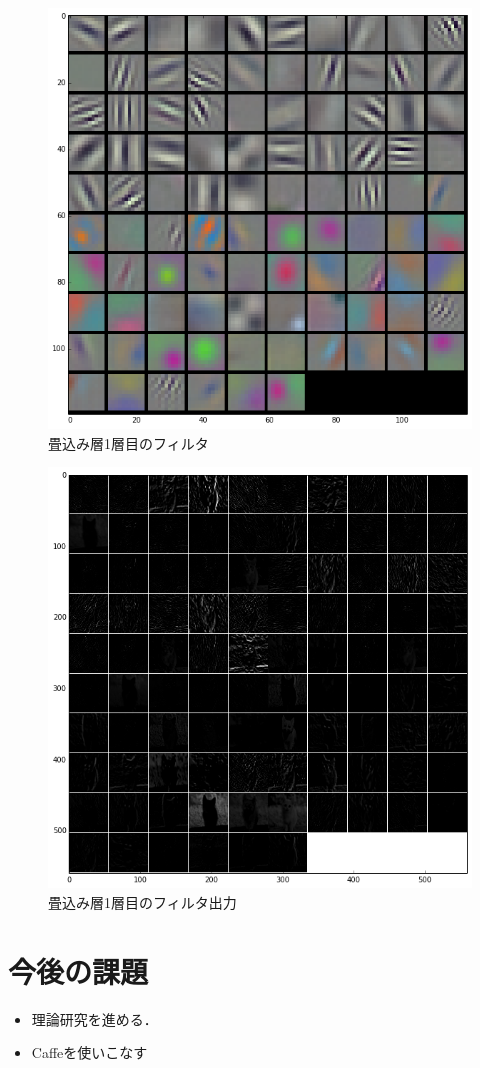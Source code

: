 \documentclass[a4paper,10pt]{jsarticle}
\begin{document}
\begin{figure}[t]
 \centering
 \includegraphics[scale=0.5]{fig/png/conv1_params.png}
  \caption{畳込み層1層目のフィルタ}
  \label{220453_1Jul15}
\end{figure}
\begin{figure}[t]
 \centering
 \includegraphics[scale=0.5]{fig/png/conv1_blobs.png}
  \caption{畳込み層1層目のフィルタ出力}
  \label{220458_1Jul15}
\end{figure}

\section{今後の課題}
\begin{itemize}
 \item 理論研究を進める．
 \item Caffeを使いこなす
\end{itemize}
\end{document}
